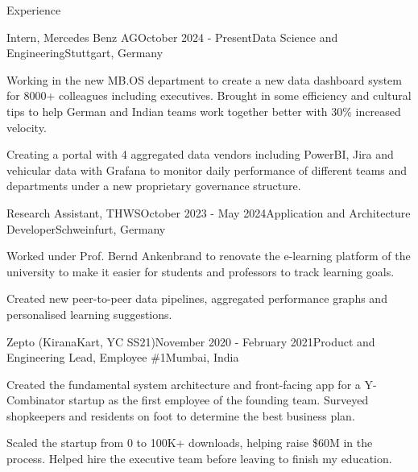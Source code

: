 \documentclass[
	a4paper, %
	10pt, %
]{resume} %
\begin{document}
\begin{rSection}{Experience}

	\begin{rSubsection}{Intern, Mercedes Benz AG}{October 2024 - Present}{Data Science and Engineering}{Stuttgart, Germany}
		\item Working in the new MB.OS department to create a new data dashboard system for 8000+ colleagues including executives. Brought in some efficiency and cultural tips to help German and Indian teams work together better with 30\% increased velocity.
		\item Creating a portal with 4 aggregated data vendors including PowerBI, Jira and vehicular data with Grafana to monitor daily performance of different teams and departments under a new proprietary governance structure.
	\end{rSubsection}


	\begin{rSubsection}{Research Assistant, THWS}{October 2023 - May 2024}{Application and Architecture Developer}{Schweinfurt, Germany}
		\item Worked under Prof. Bernd Ankenbrand to renovate the e-learning platform of the university to make it easier for students and professors to track learning goals.
		\item Created new peer-to-peer data pipelines, aggregated performance graphs and personalised learning suggestions.
	\end{rSubsection}


	\begin{rSubsection}{Zepto (KiranaKart, YC SS21)}{November 2020 - February 2021}{Product and Engineering Lead, Employee \#1}{Mumbai, India}
		\item Created the fundamental system architecture and front-facing app for a Y-Combinator startup as the first employee of the founding team. Surveyed shopkeepers and residents on foot to determine the best business plan.
		\item Scaled the startup from 0 to 100K+ downloads, helping raise \$60M in the process. Helped hire the executive team before leaving to finish my education.
	\end{rSubsection}

\end{rSection}

\end{document}

